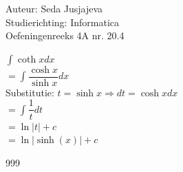 \documentclass[a4paper]{article}
\newcommand{\integral}{\displaystyle\int}
\begin{document}
\noindent \large Auteur: Seda Jusjajeva\\
\noindent \large Studierichting: Informatica\\
\noindent \large Oefeningenreeks 4A nr. 20.4 \\

\medskip

\normalsize

$\integral \coth x dx$ \\

$= \integral \dfrac{\cosh x}{\sinh x}dx$ \\

Substitutie: $t = \sinh x \Rightarrow dt = \cosh xdx$ \\

$= \integral \dfrac{1}{t}dt$ \\

$= \ln|t| + c$ \\

$= \ln|\sinh(x)| + c$ \\



\begin{thebibliography}{999}
\end{thebibliography}
\end{document}
